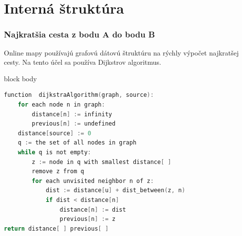 \documentclass{beamer}
\newenvironment{program}{\begin{beamercolorbox}[rounded=true,shadow=true]{block body}\vspace{-4mm}}{\vspace{-2mm}\end{beamercolorbox}}
\begin{document}
\section{Interná štruktúra}

\begin{frame}[fragile=singleslide]\frametitle{Najkratšia cesta z bodu A do bodu B}
Online mapy používajú grafovú dátovú štruktúru na rýchly výpočet najkratšej cesty. Na tento účel sa používa Dijkstrov algoritmus.
\begin{program}
\begin{lstlisting}[language=C, caption=Reprezentácia pseudokódu]
function  dijkstraAlgorithm(graph, source):
	for each node n in graph:
		distance[n] := infinity
		previous[n] := undefined
	distance[source] := 0
	q := the set of all nodes in graph
	while q is not empty:
		z := node in q with smallest distance[ ]
		remove z from q
		for each unvisited neighbor n of z:
			dist := distance[u] + dist_between(z, n)
			if dist < distance[n]
				distance[n] := dist
				previous[n] := z
return distance[ ] previous[ ]
	
\end{lstlisting}
\end{program}
\end{frame}
\end{document}
